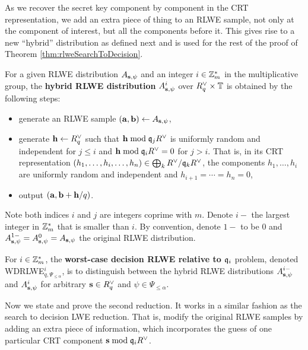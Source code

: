 \documentclass[../main.tex]{subfiles}
\begin{document}
As we recover the secret key component by component in the CRT representation, we add an extra piece of thing to an RLWE sample, not only at the component of interest, but all the components  before it. This gives rise to a new ``hybrid'' distribution as defined next and is used for the rest of the proof of Theorem \ref{thm:rlweSearchToDecision}.

\begin{definition}
\reversemarginpar
{}
For a given RLWE distribution $A_{\mathbf{s},\psi}$ and an integer $i \in \mathbb{Z}_m^*$ in the multiplicative group, the \textbf{hybrid RLWE distribution} $A_{\mathbf{s},\psi}^i$ over $R^{\vee}_q \times \mathbb{T}$ is obtained by the following steps:
\begin{itemize}
    \item generate an RLWE sample $(\mathbf{a},\mathbf{b}) \leftarrow A_{\mathbf{s},\psi}$,
    \item generate $\mathbf{h} \leftarrow R^{\vee}_q$ such that $\mathbf{h} \bmod \mathfrak{q}_j R^{\vee}$ is uniformly random and independent for $j \le i$ and $\mathbf{h} \bmod \mathfrak{q}_i R^{\vee}=0$ for $j > i$. That is, in its CRT representation $(h_1, \dots, h_i, \dots, h_n) \in \bigoplus_k R^{\vee}/\mathfrak{q}_k R^{\vee}$, the components $h_1, \dots, h_i$ are uniformly random and independent and $h_{i+1}=\cdots =h_n=0$,
    \item output $(\mathbf{a},\mathbf{b}+\mathbf{h}/q)$.
\end{itemize}
\end{definition}

Note both indices $i$ and $j$ are integers coprime with $m$. Denote $i-$ the largest integer in $\mathbb{Z}_m^*$ that is smaller than $i$. By convention, denote $1-$ to be 0 and $A_{\mathbf{s},\psi}^{1-}=A_{\mathbf{s},\psi}^0=A_{\mathbf{s},\psi}$ the original RLWE distribution. 

\begin{definition}
\reversemarginpar
{}
For $i \in \mathbb{Z}_m^*$, the \textbf{worst-case decision RLWE relative to $\mathfrak{q}_i$} problem, denoted WDRLWE$_{q,\Psi_{\le \alpha}}^i$, is to distinguish between the hybrid RLWE distributions $A_{\mathbf{s},\psi}^{i-}$ and $A_{\mathbf{s},\psi}^i$ for arbitrary $\mathbf{s} \in R^{\vee}_q$ and $\psi \in \Psi_{\le \alpha}$.
\end{definition}

Now we state and prove the second reduction. It works in a similar fashion as the search to decision LWE reduction. That is, modify the original RLWE samples by adding an extra piece of information, which incorporates the guess of one particular CRT component $\mathbf{s} \bmod \mathfrak{q}_i R^{\vee}$.  
\end{document}
